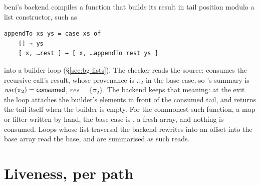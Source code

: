 beni's backend compiles a function that builds its result in tail position modulo a list constructor,
such as
\begin{Verbatim}
appendTo xs ys = case xs of
    [] → ys
    [ x, …rest ] → [ x, …appendTo rest ys ]
\end{Verbatim}
into a builder loop (\S\ref{sec:bg-lists}). The checker reads the source: 
consumes the recursive call's result, whose provenance is $\pi_2$ in the base case, so 's
summary is $\mathit{use}(\pi_2) = \mathsf{consumed}$, $\mathit{res} = \{\pi_2\}$. The backend keeps that meaning:
at the exit the loop attaches the builder's elements in front of the consumed tail, and returns the tail
itself when the builder is empty. For the commonest such function, a map or filter written by hand, the
base case is \code{[]}, a fresh array, and nothing is consumed. Loops whose list traversal the backend
rewrites into an offset into the base array read the base, and are summarised as such reads.

\section{Liveness, per path}
\label{sec:model-liveness}

